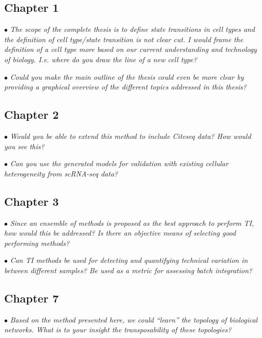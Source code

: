 \documentclass[10pt]{article}
\newcommand{\exam}[2][\  ]{\hspace{0pt}\marginpar{\color{red}#1}$\bullet$ \textit{#2}}
\begin{document}
{\subsection{Chapter 1}

\exam{The scope of the complete thesis is to define state transitions in cell types and the
	definition of cell type/state transition is not clear cut. I would frame the definition of a cell
	type more based on our current understanding and technology of biology. I.e. where do you
	draw the line of a new cell type?}

\exam{Could you make the main outline of the thesis could even be more clear by
	providing a graphical overview of the different topics addressed in this thesis?}

\subsection{Chapter 2}
\exam{Would you be able to extend this method to include Citeseq data? How would
	you see this?}

\exam{Can you use the generated models for validation with existing cellular
	heterogeneity from scRNA-seq data?}

\subsection{Chapter 3}

\exam{Since an ensemble of methods is proposed as the best approach to perform TI,
	how would this be addressed? Is there an objective means of selecting good performing
	methods?}

\exam{Can TI methods be used for detecting and quantifying technical variation in
	between different samples? Be used as a metric for assessing batch integration?}

\subsection{Chapter 7}

\exam{Based on the method presented here, we could “learn” the topology of biological
	networks. What is to your insight the transposability of these topologies?}

}
\end{document}
